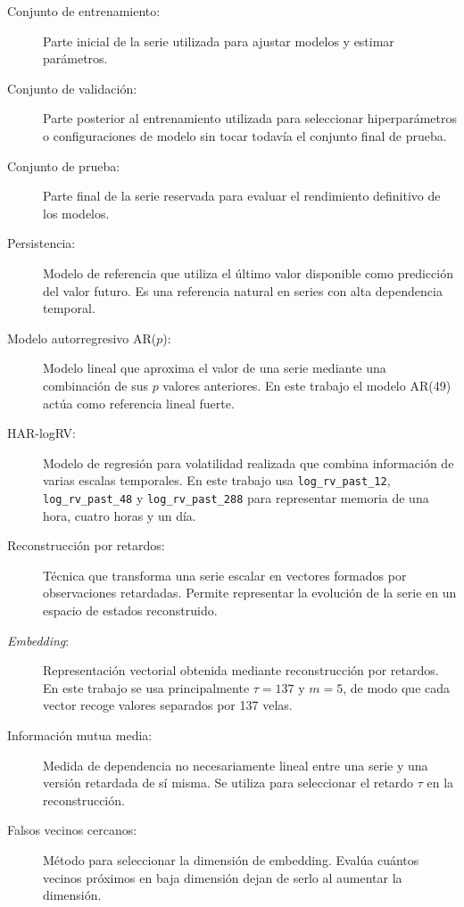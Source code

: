 \begin{description}
    \item[Conjunto de entrenamiento:] Parte inicial de la serie utilizada para ajustar modelos y estimar parámetros.

    \item[Conjunto de validación:] Parte posterior al entrenamiento utilizada para seleccionar hiperparámetros o configuraciones de modelo sin tocar todavía el conjunto final de prueba.

    \item[Conjunto de prueba:] Parte final de la serie reservada para evaluar el rendimiento definitivo de los modelos.

    \item[Persistencia:] Modelo de referencia que utiliza el último valor disponible como predicción del valor futuro. Es una referencia natural en series con alta dependencia temporal.

    \item[Modelo autorregresivo AR(\(p\)):] Modelo lineal que aproxima el valor de una serie mediante una combinación de sus \(p\) valores anteriores. En este trabajo el modelo AR(49) actúa como referencia lineal fuerte.

    \item[HAR-logRV:] Modelo de regresión para volatilidad realizada que combina información de varias escalas temporales. En este trabajo usa \texttt{log\_rv\_past\_12}, \texttt{log\_rv\_past\_48} y \texttt{log\_rv\_past\_288} para representar memoria de una hora, cuatro horas y un día.

    \item[Reconstrucción por retardos:] Técnica que transforma una serie escalar en vectores formados por observaciones retardadas. Permite representar la evolución de la serie en un espacio de estados reconstruido.

    \item[\textit{Embedding}:] Representación vectorial obtenida mediante reconstrucción por retardos. En este trabajo se usa principalmente \(\tau = 137\) y \(m = 5\), de modo que cada vector recoge valores separados por 137 velas.

    \item[Información mutua media:] Medida de dependencia no necesariamente lineal entre una serie y una versión retardada de sí misma. Se utiliza para seleccionar el retardo \(\tau\) en la reconstrucción.

    \item[Falsos vecinos cercanos:] Método para seleccionar la dimensión de embedding. Evalúa cuántos vecinos próximos en baja dimensión dejan de serlo al aumentar la dimensión.


\end{description}
